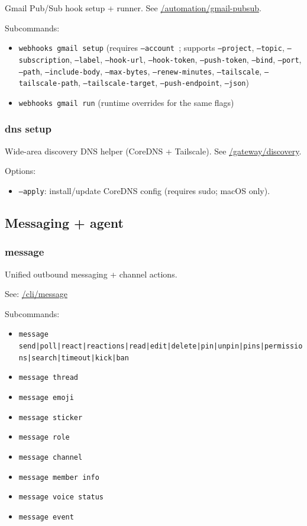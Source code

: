 Gmail Pub/Sub hook setup + runner. See \href{/automation/gmail-pubsub}{/automation/gmail-pubsub}.

Subcommands:

\begin{itemize}
  \item \texttt{webhooks gmail setup} (requires \texttt{--account }; supports \texttt{--project}, \texttt{--topic}, \texttt{--subscription}, \texttt{--label}, \texttt{--hook-url}, \texttt{--hook-token}, \texttt{--push-token}, \texttt{--bind}, \texttt{--port}, \texttt{--path}, \texttt{--include-body}, \texttt{--max-bytes}, \texttt{--renew-minutes}, \texttt{--tailscale}, \texttt{--tailscale-path}, \texttt{--tailscale-target}, \texttt{--push-endpoint}, \texttt{--json})
  \item \texttt{webhooks gmail run} (runtime overrides for the same flags)
\end{itemize}


\subsubsection{dns setup}


Wide-area discovery DNS helper (CoreDNS + Tailscale). See \href{/gateway/discovery}{/gateway/discovery}.

Options:

\begin{itemize}
  \item \texttt{--apply}: install/update CoreDNS config (requires sudo; macOS only).
\end{itemize}


\subsection{Messaging + agent}


\subsubsection{message}


Unified outbound messaging + channel actions.

See: \href{/cli/message}{/cli/message}

Subcommands:

\begin{itemize}
  \item \texttt{message send|poll|react|reactions|read|edit|delete|pin|unpin|pins|permissions|search|timeout|kick|ban}
  \item \texttt{message thread }
  \item \texttt{message emoji }
  \item \texttt{message sticker }
  \item \texttt{message role }
  \item \texttt{message channel }
  \item \texttt{message member info}
  \item \texttt{message voice status}
  \item \texttt{message event }
\end{itemize}


